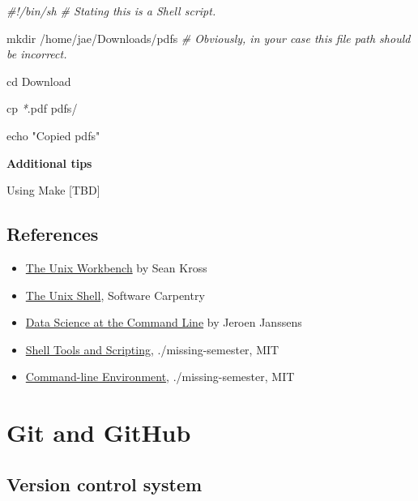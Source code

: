 \documentclass[
]{book}
\newenvironment{Shaded}{\begin{snugshade}}{\end{snugshade}}
\newcommand{\BuiltInTok}[1]{#1}
\newcommand{\CommentTok}[1]{\textcolor[rgb]{0.56,0.35,0.01}{\textit{#1}}}
\newcommand{\FunctionTok}[1]{\textcolor[rgb]{0.00,0.00,0.00}{#1}}
\newcommand{\NormalTok}[1]{#1}
\newcommand{\PreprocessorTok}[1]{\textcolor[rgb]{0.56,0.35,0.01}{\textit{#1}}}
\newcommand{\StringTok}[1]{\textcolor[rgb]{0.31,0.60,0.02}{#1}}
\begin{document}
\begin{Shaded}
\begin{Highlighting}[]

\CommentTok{\#!/bin/sh \# Stating this is a Shell script. }

\FunctionTok{mkdir}\NormalTok{ /home/jae/Downloads/pdfs }\CommentTok{\# Obviously, in your case this file path should be incorrect.}

\BuiltInTok{cd}\NormalTok{ Download}

\FunctionTok{cp} \PreprocessorTok{*}\NormalTok{.pdf pdfs/ }

\BuiltInTok{echo} \StringTok{"Copied pdfs"}
\end{Highlighting}
\end{Shaded}

\textbf{Additional tips}

Using Make {[}TBD{]}

\hypertarget{references-1}{%
\subsection{References}\label{references-1}}

\begin{itemize}
\item
  \href{https://seankross.com/the-unix-workbench/}{The Unix Workbench} by Sean Kross
\item
  \href{http://swcarpentry.GitHub.io/shell-novice/}{The Unix Shell}, Software Carpentry
\item
  \href{https://www.datascienceatthecommandline.com/1e/}{Data Science at the Command Line} by Jeroen Janssens
\end{itemize}

\begin{itemize}
\item
  \href{https://missing.csail.mit.edu/2020/shell-tools/}{Shell Tools and Scripting}, ./missing-semester, MIT
\item
  \href{https://missing.csail.mit.edu/2020/command-line/}{Command-line Environment}, ./missing-semester, MIT
\end{itemize}

\hypertarget{git-and-github}{%
\section{Git and GitHub}\label{git-and-github}}

\hypertarget{version-control-system}{%
\subsection{Version control system}\label{version-control-system}}
\end{document}
